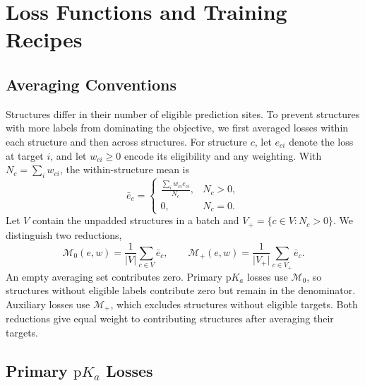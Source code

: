 \section{Loss Functions and Training Recipes}
\label{app:jaxka-losses}

\subsection{Averaging Conventions}
\label{app:jaxka-loss-reductions}

Structures differ in their number of eligible prediction sites. To prevent structures with more labels from dominating the objective, we first averaged losses within each structure and then across structures. For structure $c$, let $e_{ci}$ denote the loss at target $i$, and let $w_{ci}\geq0$ encode its eligibility and any weighting. With $N_c=\sum_i w_{ci}$, the within-structure mean is
\begin{equation}
    \bar e_c =
    \begin{cases}
        \displaystyle\frac{\sum_i w_{ci}e_{ci}}{N_c}, & N_c>0,\\[4pt]
        0, & N_c=0.
    \end{cases}
    \label{eq:jaxka-within-structure-mean}
\end{equation}
Let $V$ contain the unpadded structures in a batch and $V_+=\{c\in V:N_c>0\}$. We distinguish two reductions,
\begin{equation}
    \mathcal M_0(e,w)=\frac{1}{\lvert V\rvert}\sum_{c\in V}\bar e_c,
    \qquad
    \mathcal M_+(e,w)=\frac{1}{\lvert V_+\rvert}\sum_{c\in V_+}\bar e_c.
    \label{eq:jaxka-loss-reductions}
\end{equation}
An empty averaging set contributes zero. Primary $\mathrm{p}K_a$ losses use $\mathcal M_0$, so structures without eligible labels contribute zero but remain in the denominator. Auxiliary losses use $\mathcal M_+$, which excludes structures without eligible targets. Both reductions give equal weight to contributing structures after averaging their targets.

\subsection{Primary \texorpdfstring{$\mathrm{p}K_a$}{pKa} Losses}
\label{app:jaxka-primary-losses}

